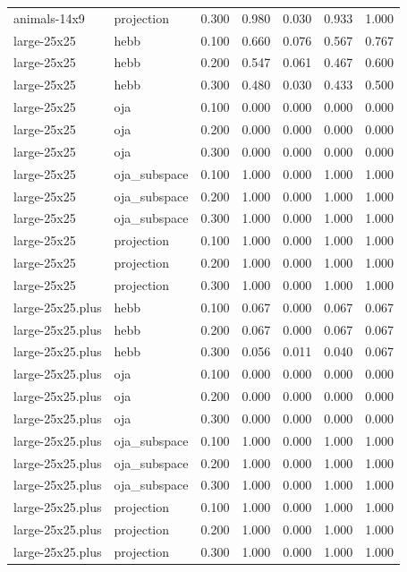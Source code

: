 \begin{tabular}{llrrrrr}
animals-14x9 & projection & 0.300 & 0.980 & 0.030 & 0.933 & 1.000 \\
large-25x25 & hebb & 0.100 & 0.660 & 0.076 & 0.567 & 0.767 \\
large-25x25 & hebb & 0.200 & 0.547 & 0.061 & 0.467 & 0.600 \\
large-25x25 & hebb & 0.300 & 0.480 & 0.030 & 0.433 & 0.500 \\
large-25x25 & oja & 0.100 & 0.000 & 0.000 & 0.000 & 0.000 \\
large-25x25 & oja & 0.200 & 0.000 & 0.000 & 0.000 & 0.000 \\
large-25x25 & oja & 0.300 & 0.000 & 0.000 & 0.000 & 0.000 \\
large-25x25 & oja\_subspace & 0.100 & 1.000 & 0.000 & 1.000 & 1.000 \\
large-25x25 & oja\_subspace & 0.200 & 1.000 & 0.000 & 1.000 & 1.000 \\
large-25x25 & oja\_subspace & 0.300 & 1.000 & 0.000 & 1.000 & 1.000 \\
large-25x25 & projection & 0.100 & 1.000 & 0.000 & 1.000 & 1.000 \\
large-25x25 & projection & 0.200 & 1.000 & 0.000 & 1.000 & 1.000 \\
large-25x25 & projection & 0.300 & 1.000 & 0.000 & 1.000 & 1.000 \\
large-25x25.plus & hebb & 0.100 & 0.067 & 0.000 & 0.067 & 0.067 \\
large-25x25.plus & hebb & 0.200 & 0.067 & 0.000 & 0.067 & 0.067 \\
large-25x25.plus & hebb & 0.300 & 0.056 & 0.011 & 0.040 & 0.067 \\
large-25x25.plus & oja & 0.100 & 0.000 & 0.000 & 0.000 & 0.000 \\
large-25x25.plus & oja & 0.200 & 0.000 & 0.000 & 0.000 & 0.000 \\
large-25x25.plus & oja & 0.300 & 0.000 & 0.000 & 0.000 & 0.000 \\
large-25x25.plus & oja\_subspace & 0.100 & 1.000 & 0.000 & 1.000 & 1.000 \\
large-25x25.plus & oja\_subspace & 0.200 & 1.000 & 0.000 & 1.000 & 1.000 \\
large-25x25.plus & oja\_subspace & 0.300 & 1.000 & 0.000 & 1.000 & 1.000 \\
large-25x25.plus & projection & 0.100 & 1.000 & 0.000 & 1.000 & 1.000 \\
large-25x25.plus & projection & 0.200 & 1.000 & 0.000 & 1.000 & 1.000 \\
large-25x25.plus & projection & 0.300 & 1.000 & 0.000 & 1.000 & 1.000 \\

\end{tabular}
